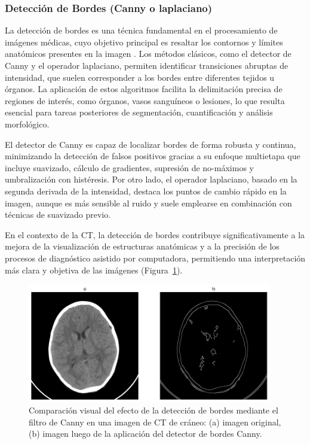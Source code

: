 \subsubsection{Detección de Bordes (Canny o laplaciano)}

La detección de bordes es una técnica fundamental en el procesamiento de imágenes médicas, cuyo objetivo principal es resaltar los contornos y límites anatómicos presentes en la imagen \cite{CannyBorderDetection,LaplacianBorderDetection}. Los métodos clásicos, como el detector de Canny y el operador laplaciano, permiten identificar transiciones abruptas de intensidad, que suelen corresponder a los bordes entre diferentes tejidos u órganos. La aplicación de estos algoritmos facilita la delimitación precisa de regiones de interés, como órganos, vasos sanguíneos o lesiones, lo que resulta esencial para tareas posteriores de segmentación, cuantificación y análisis morfológico.

El detector de Canny es capaz de localizar bordes de forma robusta y continua, minimizando la detección de falsos positivos gracias a su enfoque multietapa que incluye suavizado, cálculo de gradientes, supresión de no-máximos y umbralización con histéresis. Por otro lado, el operador laplaciano, basado en la segunda derivada de la intensidad, destaca los puntos de cambio rápido en la imagen, aunque es más sensible al ruido y suele emplearse en combinación con técnicas de suavizado previo.

En el contexto de la CT, la detección de bordes contribuye significativamente a la mejora de la visualización de estructuras anatómicas y a la precisión de los procesos de diagnóstico asistido por computadora, permitiendo una interpretación más clara y objetiva de las imágenes (Figura~\ref{fig:filter-canny}).

\begin{figure}[H]
    \centering
    \includegraphics[width=0.95\textwidth]{Graphics/canny.png}
    \caption{Comparación visual del efecto de la detección de bordes mediante el filtro de Canny en una imagen de CT de cráneo: (a) imagen original, (b) imagen luego de la aplicación del detector de bordes Canny.}
    \label{fig:filter-canny}
\end{figure}


